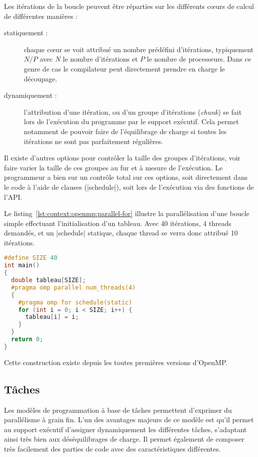 Les itérations de la boucle peuvent être réparties sur les différents cœurs de calcul de différentes manières :
\begin{description}
  \item [statiquement :] chaque cœur se voit attribué un nombre prédéfini d'itérations, typiquement $N/P$ avec $N$ le nombre d'itérations et $P$ le nombre de processeurs. Dans ce genre de cas le compilateur peut directement prendre en charge le découpage.
  \item [dynamiquement :] l'attribution d'une itération, ou d'un groupe d'itérations (\emph{chunk}) se fait lors de l'exécution du programme par le support exécutif. Cela permet notamment de pouvoir faire de l'équilibrage de charge si toutes les itérations ne sont pas parfaitement régulières.
\end{description}
Il existe d'autres options pour contrôler la taille des groupes d'itérations, voir faire varier la taille de ces groupes au fur et à mesure de l'exécution.
Le programmeur a bien sur un contrôle total sur ces options, soit directement dans le code à l'aide de clauses (|schedule|), soit lors de l'exécution via des fonctions de l'API.

Le listing~\ref{lst:context:openmp:parallel-for} illustre la parallélisation d'une boucle simple effectuant l'initialisation d'un tableau. Avec 40 itérations, 4 threads demandés, et un |schedule| statique, chaque thread se verra donc attribué 10 itérations.

\begin{lstlisting}[language=c++,caption=Exemple d'utilisation d'un for,label=lst:context:openmp:parallel-for,basicstyle=\small]
#define SIZE 40
int main()
{
  double tableau[SIZE];
  #pragma omp parallel num_threads(4)
  {
    #pragma omp for schedule(static)
    for (int i = 0; i < SIZE; i++) {
      tableau[i] = i;
    }
  }
  return 0;
}
\end{lstlisting}

Cette construction existe depuis les toutes premières versions d'OpenMP.


\subsection{Tâches}

Les modèles de programmation à base de tâches permettent d'exprimer du parallélisme à grain fin. L'un des avantages majeurs de ce modèle est qu'il permet au support exécutif d'assigner dynamiquement les différentes tâches, s'adaptant ainsi très bien aux déséquilibrages de charge. Il permet également de composer très facilement des parties de code avec des caractéristiques différentes.

